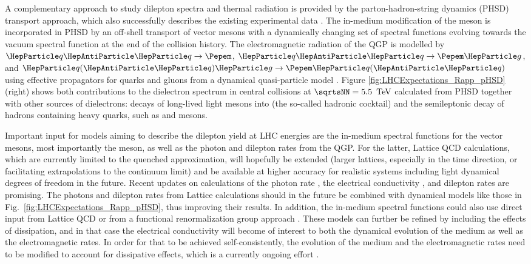 \documentclass[../report.tex]{subfiles}
\begin{document}
A complementary approach to study dilepton spectra and thermal radiation is provided by the parton-hadron-string dynamics (PHSD) transport approach, which also successfully describes the existing experimental data \cite{Linnyk:2015rco,Cassing:2009vt}. The in-medium modification of the \PGr meson is incorporated in PHSD by an off-shell transport of vector mesons with a dynamically changing set of spectral functions \cite{Bratkovskaya:2007jk} evolving towards the vacuum spectral function at the end of the collision history. The electromagnetic radiation of the QGP is modelled by $\PQq\PAQq\rightarrow\Pepem$, $\PQq\PAQq\rightarrow\Pepem\Pg$, and $\PQq(\PAQq)\Pg\rightarrow\Pepem\PQq(\PAQq)$ using effective propagators for quarks and gluons from a dynamical quasi-particle model \cite{Linnyk:2010vb}. Figure \ref{fig:LHCExpectations_Rapp_pHSD} (right) shows both contributions to the dielectron spectrum in central \PbPb{} collisions at $\sqrtsNN = \unit[5.5]{\UTeV}$ calculated from PHSD together with other sources of dielectrons: decays of long-lived light mesons into \Pepem (the so-called hadronic cocktail) and the semileptonic decay of hadrons containing heavy quarks, such as \PD and \PB mesons. 

Important input for models aiming to describe the dilepton yield at LHC energies are the in-medium spectral functions for the vector mesons, most importantly the \PGr meson, as well as the photon and dilepton rates from the QGP. For the latter, Lattice QCD calculations, which are currently limited to the quenched approximation, will hopefully be extended (\eg larger lattices, especially in the time direction, or facilitating extrapolations to the continuum limit) and be available at higher accuracy for realistic systems including light dynamical degrees of freedom in the future. Recent updates on calculations of the photon rate \cite{Ghiglieri:2016tvj}, the electrical conductivity \cite{Aarts:2014nba}, and dilepton rates \cite{Ding:2016hua} are promising.
The photons and dilepton rates from Lattice calculations should in the future be combined with dynamical models like those in Fig.~\ref{fig:LHCExpectations_Rapp_pHSD}, thus improving their results. In addition, the in-medium spectral functions could also use direct input from Lattice QCD \cite{Aarts:2005hg,Brandt:2015aqk} or from a functional renormalization group approach \cite{Jung:2016yxl}. These models can further be refined by including the effects of dissipation, and in that case the electrical conductivity will become of interest to both the dynamical evolution of the medium as well as the electromagnetic rates. In order for that to be achieved self-consistently, the evolution of the medium and the electromagnetic rates need to be modified to account for dissipative effects, which is a currently ongoing effort \cite{Paquet:2015lta,Vujanovic:2017wtw,Vujanovic:2017psb}.
\end{document}
